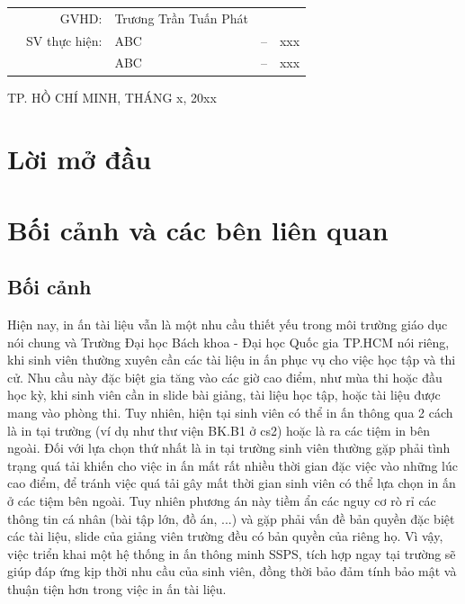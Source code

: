 \documentclass[a4paper]{article}
\begin{document}
\begin{titlepage}
\vspace{0.3cm}

	\begin{table}[h]
		\centering
		\begin{tabular}{rrlcl}
			\hspace{2.25 cm} & GVHD: & Trương Trần Tuấn Phát & & \\
			& SV thực hiện: & ABC & -- & xxx \\
            & & ABC & -- & xxx \\
		\end{tabular}
	\end{table}


\begin{center}
{\footnotesize TP. HỒ CHÍ MINH, THÁNG x, 20xx}
\end{center}
\end{titlepage}


\newpage
\tableofcontents
\newpage
\section*{Lời mở đầu}

\newpage
\section{Bối cảnh và các bên liên quan}
\subsection{Bối cảnh}
Hiện nay, in ấn tài liệu vẫn là một nhu cầu thiết yếu trong môi trường giáo dục nói chung và Trường Đại học Bách khoa - Đại học Quốc gia TP.HCM nói riêng, khi sinh viên thường xuyên cần các tài liệu in ấn phục vụ cho việc học tập và thi cử. Nhu cầu này đặc biệt gia tăng vào các giờ cao điểm, như mùa thi hoặc đầu học kỳ, khi sinh viên cần in slide bài giảng, tài liệu học tập, hoặc tài liệu được mang vào phòng thi. Tuy nhiên, hiện tại sinh viên có thể in ấn thông qua 2 cách là in tại trường (ví dụ như thư viện BK.B1 ở cs2) hoặc là ra các tiệm in bên ngoài. Đối với lựa chọn thứ nhất là in tại trường sinh viên thường gặp phải tình trạng quá tải khiến cho việc in ấn mất rất nhiều thời gian đặc việc vào những lúc cao điểm, để tránh việc quá tải gây mất thời gian sinh viên có thể lựa chọn in ấn ở các tiệm bên ngoài. Tuy nhiên phương án này tiềm ẩn các nguy cơ rò rỉ các thông tin cá nhân (bài tập lớn, đồ án, ...) và gặp phải vấn đề bản quyền đặc biệt các tài liệu, slide của giảng viên trường đều có bản quyền của riêng họ. Vì vậy, việc triển khai một hệ thống in ấn thông minh SSPS, tích hợp ngay tại trường sẽ giúp đáp ứng kịp thời nhu cầu của sinh viên, đồng thời bảo đảm tính bảo mật và thuận tiện hơn trong việc in ấn tài liệu.
\end{document}
